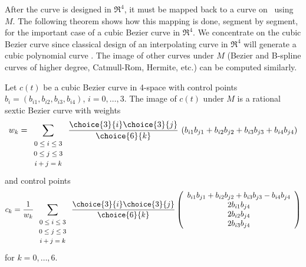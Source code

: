 After the curve is designed in $\Re^4$, it must be mapped back to a curve
on \ using $M$.
The following theorem shows how this mapping is done, segment by segment,
for the important case of a cubic Bezier curve in $\Re^4$.
We concentrate on the cubic Bezier curve since classical design of an 
interpolating curve in $\Re^4$ will generate
a cubic polynomial curve \cite{farin97}.	%
The image of other curves under $M$ (Bezier and B-spline curves of higher
degree, Catmull-Rom, Hermite, etc.) can be computed similarly.

\begin{theorem}
\label{sextic}
Let $c(t)$ be a cubic Bezier curve in 4-space with
control points $b_i = (b_{i1},b_{i2},b_{i3},b_{i4})$, $i=0,\ldots,3$.
The image of $c(t)$ under $M$ is a rational sextic Bezier curve with 
weights 
\begin{equation}
\label{eq:weights}
w_k = \sum_{\begin{array}{c} \mbox{\footnotesize{$0 \leq i \leq 3$}} \\ 
			     \mbox{\footnotesize{$0 \leq j \leq 3$}} \\ 
			     \mbox{\footnotesize{$i+j=k$}}
			     \end{array}}
        \frac{\choice{3}{i} \choice{3}{j}}{\choice{6}{k}}
	\ (b_{i1} b_{j1} + b_{i2} b_{j2} + b_{i3} b_{j3} + b_{i4} b_{j4})
\end{equation}
and control points 
\begin{equation}
\label{eq:control-pts}
c_k = \frac{1}{w_k} 
      \sum_{\begin{array}{c} \mbox{\footnotesize{$0 \leq i \leq 3$}} \\ 
			     \mbox{\footnotesize{$0 \leq j \leq 3$}} \\ 
			     \mbox{\footnotesize{$i+j=k$}}
			     \end{array}} 
        \frac{\choice{3}{i} \choice{3}{j}}{\choice{6}{k}}
	\left( \begin{array}{c}
            b_{i1} b_{j1} + b_{i2} b_{j2} + b_{i3} b_{j3} - b_{i4} b_{j4} \\
            2b_{i1} b_{j4} \\
            2b_{i2} b_{j4} \\
            2b_{i3} b_{j4} 
	\end{array} \right)
\end{equation}
for $k = 0, \ldots, 6$.
\end{theorem}
